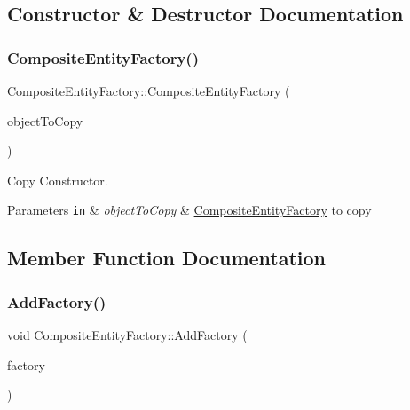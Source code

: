 \subsection{Constructor \& Destructor Documentation}
\mbox{\label{classCompositeEntityFactory_af70fe797d67a1526715369890b1fb136}} 
\subsubsection{\texorpdfstring{Composite\+Entity\+Factory()}{CompositeEntityFactory()}}
{\footnotesize\ttfamily Composite\+Entity\+Factory\+::\+Composite\+Entity\+Factory (\begin{DoxyParamCaption}\item[{const \hyperlink{classCompositeEntityFactory}{Composite\+Entity\+Factory} \&}]{object\+To\+Copy }\end{DoxyParamCaption})\hspace{0.3cm}{\ttfamily [inline]}}



Copy Constructor. 


\begin{DoxyParams}[1]{Parameters}
\mbox{\tt in}  & {\em object\+To\+Copy} & \hyperlink{classCompositeEntityFactory}{Composite\+Entity\+Factory} to copy \\
\hline
\end{DoxyParams}


\subsection{Member Function Documentation}
\mbox{\label{classCompositeEntityFactory_a735c4e6bf789486468c4610f75688be2}} 
\subsubsection{\texorpdfstring{Add\+Factory()}{AddFactory()}}
{\footnotesize\ttfamily void Composite\+Entity\+Factory\+::\+Add\+Factory (\begin{DoxyParamCaption}\item[{\hyperlink{classEntityFactory}{Entity\+Factory} $\ast$}]{factory }\end{DoxyParamCaption})}



